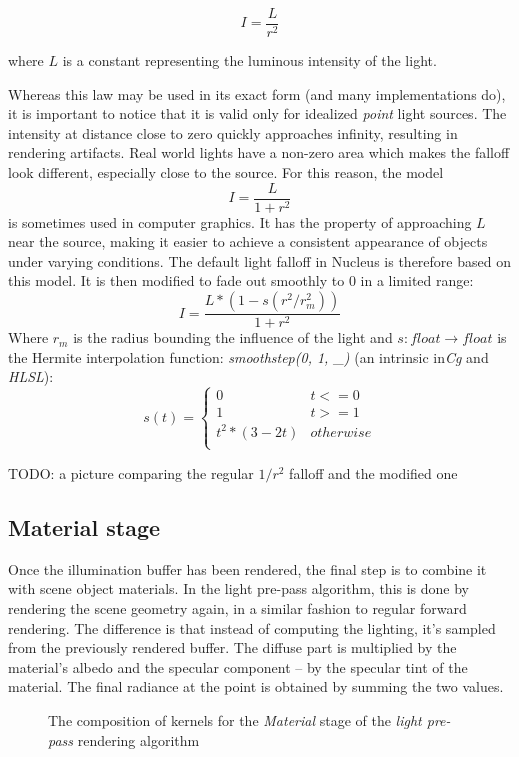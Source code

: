 \[
	I = \frac{L}{r^2}
\]

where $L$ is a constant representing the luminous intensity of the light.

Whereas this law may be used in its exact form (and many implementations do), it is important to notice that it is valid only for idealized \emph{point} light sources. The intensity at distance close to zero quickly approaches infinity, resulting in rendering artifacts. Real world lights have a non-zero area which makes the falloff look different, especially close to the source. For this reason, the model
\[
	I = \frac{L}{1 + r^2}
\]
is sometimes used in computer graphics. It has the property of approaching $L$ near the source, making it easier to achieve a consistent appearance of objects under varying conditions. The default light falloff in Nucleus is therefore based on this model. It is then modified to fade out smoothly to $0$ in a limited range:
\[
	I = \frac{L * (1 - s(r^2 / r_m^2))}{1 + r^2}
\]
Where $r_m$ is the radius bounding the influence of the light and $s : float \rightarrow float$ is the Hermite interpolation function: \emph{smoothstep(0, 1, \_)} (an intrinsic in\emph{Cg} and \emph{HLSL}):
\[
	s(t) =
	\begin{cases}
	0 & t <= 0 \\
	1 & t >= 1 \\
	t^2 * (3 - 2t) & otherwise \\
	\end{cases}
\]

TODO: a picture comparing the regular $1/r^2$ falloff and the modified one

\subsection{Material stage}

Once the illumination buffer has been rendered, the final step is to combine it with scene object materials. In the light pre-pass algorithm, this is done by rendering the scene geometry again, in a similar fashion to regular forward rendering. The difference is that instead of computing the lighting, it's sampled from the previously rendered buffer. The diffuse part is multiplied by the material's albedo and the specular component -- by the specular tint of the material. The final radiance at the point is obtained by summing the two values.

\begin{figure}[h!]
  \centering
    \caption[Light Pre-Pass Stage 3]{The composition of kernels for the \emph{Material} stage of the  \emph{light pre-pass} rendering algorithm}
  \label{fig:DeferredLightingStage3}
\end{figure}

